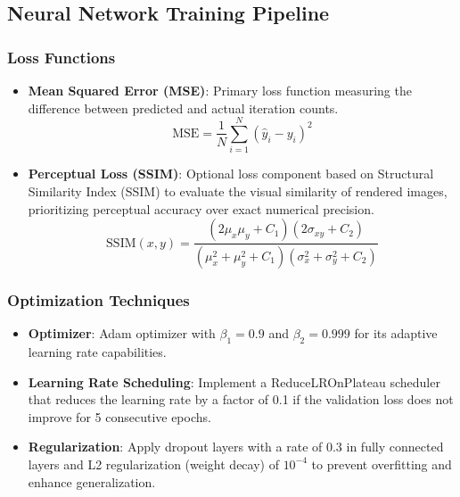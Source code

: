 \documentclass[journal]{IEEEaccess}
\begin{document}
\subsection{Neural Network Training Pipeline}
\subsubsection{Loss Functions}
\begin{itemize}
    \item \textbf{Mean Squared Error (MSE)}: Primary loss function measuring the difference between predicted and actual iteration counts.
    \[
    \text{MSE} = \frac{1}{N} \sum_{i=1}^{N} (\hat{y}_i - y_i)^2
    \]
    
    \item \textbf{Perceptual Loss (SSIM)}: Optional loss component based on Structural Similarity Index (SSIM) to evaluate the visual similarity of rendered images, prioritizing perceptual accuracy over exact numerical precision.
    \[
    \text{SSIM}(x, y) = \frac{(2\mu_x \mu_y + C_1)(2\sigma_{xy} + C_2)}{(\mu_x^2 + \mu_y^2 + C_1)(\sigma_x^2 + \sigma_y^2 + C_2)}
    \]
\end{itemize}

\subsubsection{Optimization Techniques}
\begin{itemize}
    \item \textbf{Optimizer}: Adam optimizer with \(\beta_1 = 0.9\) and \(\beta_2 = 0.999\) for its adaptive learning rate capabilities.
    
    \item \textbf{Learning Rate Scheduling}: Implement a ReduceLROnPlateau scheduler that reduces the learning rate by a factor of 0.1 if the validation loss does not improve for 5 consecutive epochs.
    
    \item \textbf{Regularization}: Apply dropout layers with a rate of 0.3 in fully connected layers and L2 regularization (weight decay) of \(10^{-4}\) to prevent overfitting and enhance generalization.
\end{itemize}
\end{document}
